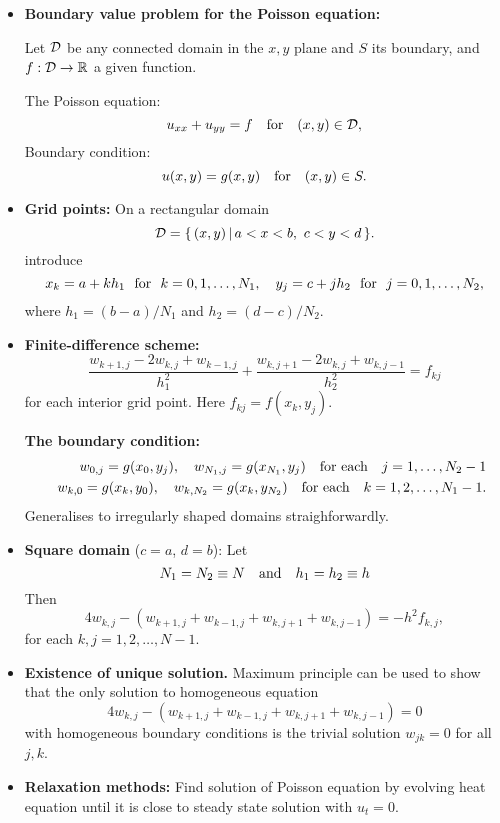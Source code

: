 \documentclass[12pt]{article}
\begin{document}
\begin{itemize}

\item \textbf{Boundary value problem for the Poisson equation:}

Let ${\cal D}$ be any connected  domain in the $x,y$ plane and $S$ its boundary, and $f:{\cal D}\to\mathbb{R}$ a given function.

The Poisson equation:
\[
u_{xx}+u_{yy} = f  \quad {\rm for} \quad (x,y)\in{\cal D},
\]
Boundary condition:
\[
u(x,y) = g(x,y) \quad \hbox{for} \quad (x,y)\in S .
\]


\item {\bf Grid points:}
On a rectangular domain
\[
{\cal D}=\{\, (x,y)\, \vert \,  a<x<b, \ c<y<d \, \}.
\]
introduce
\[
x_{k}=a+kh_{1} \ \ {\rm for} \ \ k=0,1,\dots,N_{1}, \quad
y_{j}=c+jh_{2} \ \ {\rm for} \ \ j=0,1,\dots,N_{2},
\]
where $h_{1}=(b-a)/N_{1}$ and $h_{2}=(d-c)/N_{2}$.




\item {\bf Finite-difference scheme:}
\[
\frac{w_{k+1,j}-2w_{k,j}+w_{k-1,j}}{h_{1}^{2}}+
\frac{w_{k,j+1}-2w_{k,j}+w_{k,j-1}}{h_{2}^{2}}=f_{kj}
\]
for each interior grid point.
Here $f_{kj}=f(x_{k}, y_{j})$.

{\bf The boundary condition:}
\begin{eqnarray}
&&w_{0,j}=g(x_{0}, y_{j}), \quad w_{N_{1},j}=g(x_{N_{1}}, y_{j})
\quad \hbox{for each} \quad j=1,\dots,N_{2}-1 \nonumber \\
&&w_{k,0}=g(x_{k}, y_{0}), \quad w_{k,N_{2}}=g(x_{k}, y_{N_{2}})
\quad \hbox{for each} \quad k=1,2,\dots,N_{1}-1. \nonumber
\end{eqnarray}
Generalises to irregularly shaped domains straighforwardly.


\item \textbf{Square domain} ($c=a$, $d=b$):
Let
\[
N_{1}=N_{2}\equiv N \quad {\rm and} \quad h_{1}=h_{2}\equiv h
\]
Then
\[
4w_{k,j}-\left(w_{k+1,j}+w_{k-1,j}+w_{k,j+1}+w_{k,j-1}\right)
=-h^{2}f_{k,j},
\]
for each $k,j=1,2,\dots,N-1$.

\item \textbf{Existence of unique solution.} 
Maximum principle can be used to show that the only solution to homogeneous equation 
\[
4w_{k,j}-\left(w_{k+1,j}+w_{k-1,j}+w_{k,j+1}+w_{k,j-1}\right)
=0
\]
with homogeneous boundary conditions is the trivial solution $w_{jk}=0$ for all $j,k$.


\item \textbf{Relaxation methods:}
Find solution of Poisson equation by evolving heat equation until it is close to
steady state solution with $u_t=0$.


\end{itemize}
\end{document}
